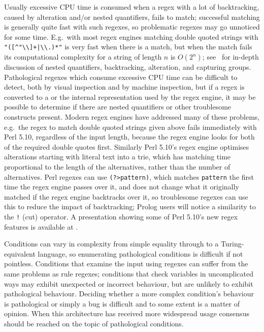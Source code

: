 Usually excessive CPU time is consumed when a regex with a lot of
backtracking, caused by alteration and/or nested quantifiers, fails to
match; successful matching is generally quite fast with such regexes, so
problematic regexes may go unnoticed for some time.  E.g.\ with most regex
engines matching double quoted strings with \verb!"([^"\\]+|\\.)*"! is very
fast when there is a match, but when the match fails its computational
complexity for a string of length $n$ is $O(2^{n})$;
see~\cite{mastering-regular-expressions} for in-depth discussion of nested
quantifiers, backtracking, alteration, and capturing groups.  Pathological
regexes which consume excessive CPU time can be difficult to detect, both
by visual inspection and by machine inspection, but if a regex is converted
to a  or the internal representation used by the regex engine,
it may be possible to determine if there are nested quantifiers or other
troublesome constructs present.  Modern regex engines have addressed many
of these problems, e.g.\ the regex to match double quoted strings given
above fails immediately with Perl 5.10, regardless of the input length,
because the regex engine looks for both of the required double quotes
first.  Similarly Perl 5.10's regex engine optimises alterations starting
with literal text into a trie, which has matching time proportional to the
length of the alternatives, rather than the number of alternatives.  Perl
regexes can use \verb!(?>pattern)!, which matches \verb!pattern! the first
time the regex engine passes over it, and does not change what it
originally matched if the regex engine backtracks over it, so troublesome
regexes can use this to reduce the impact of backtracking; Prolog users
will notice a similarity to the \verb'!' (cut) operator.  A presentation
showing some of Perl 5.10's new regex features is available at
.

Conditions can vary in complexity from simple equality through to a
Turing-equivalent language, so enumerating pathological conditions is
difficult if not pointless.  Conditions that examine the input using
regexes can suffer from the same problems as rule regexes; conditions that
check variables in uncomplicated ways may exhibit unexpected or incorrect
behaviour, but are unlikely to exhibit pathological behaviour.  Deciding
whether a more complex condition's behaviour is pathological or simply a
bug is difficult and to some extent is a matter of opinion.  When this
architecture has received more widespread usage consensus should be reached
on the topic of pathological conditions.

